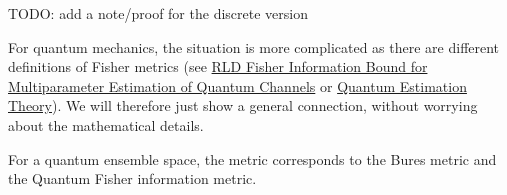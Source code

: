 \begin{mathSection}
TODO: add a note/proof for the discrete version

\begin{remark}
	For quantum mechanics, the situation is more complicated as there are different definitions of Fisher metrics (see \href{https://arxiv.org/pdf/2008.11178}{RLD Fisher Information Bound for Multiparameter
		Estimation of Quantum Channels} or \href{https://link.springer.com/chapter/10.1007/978-4-431-54493-7_4}{Quantum Estimation Theory}). We will therefore just show a general connection, without worrying about the mathematical details.
	
\end{remark}

\begin{prop}
	For a quantum ensemble space, the metric corresponds to the Bures metric and the Quantum Fisher information metric.
\end{prop}


\end{mathSection}
